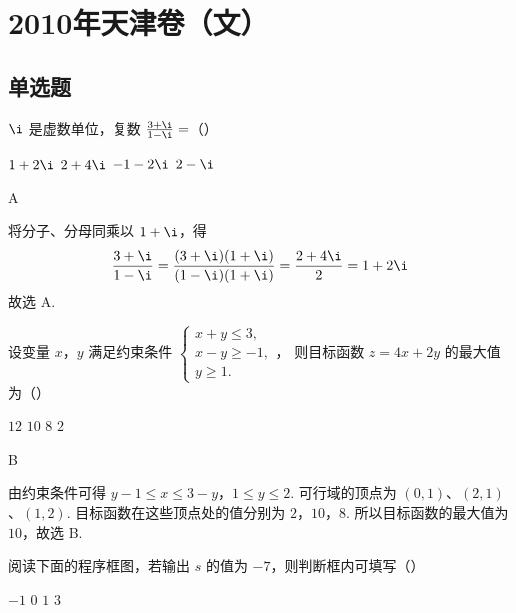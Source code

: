 \chapter{2010年天津卷（文）}

\section{单选题}

\begin{problem}
\(\i\) 是虚数单位，复数 \(\frac{3 + \i}{1 - \i} =\)（\quad）

\choices
    {\(1 + 2\i\)}
    {\(2 + 4\i\)}
    {\(-1 - 2\i\)}
    {\(2 - \i\)}
\end{problem}

\begin{answer}
A
\end{answer}

\begin{solution}
将分子、分母同乘以 \(1+\i\)，得
\[
\frac{3+\i}{1-\i}=\frac{(3+\i)(1+\i)}{(1-\i)(1+\i)}
=\frac{2+4\i}{2}=1+2\i
\]
故选 A.
\end{solution}

\begin{problem}
设变量 \(x\)，\(y\) 满足约束条件 \(\begin{cases}
x + y \leqslant 3,\\
x - y \geqslant -1,\\
y \geqslant 1.
\end{cases}\)，
则目标函数 \(z = 4x + 2y\) 的最大值为（\quad）

\choices
    {\(12\)}
    {\(10\)}
    {\(8\)}
    {\(2\)}
\end{problem}

\begin{answer}
B
\end{answer}

\begin{solution}
由约束条件可得
\(y-1\leqslant x\leqslant 3-y\)，\(1\leqslant y\leqslant 2\).
可行域的顶点为 \((0,1)\)、\((2,1)\)、\((1,2)\). 目标函数在这些顶点处的值分别为
\(2\)，\(10\)，\(8\).
所以目标函数的最大值为 \(10\)，故选 B.
\end{solution}

\begin{problem}
阅读下面的程序框图，若输出 \(s\) 的值为 \(-7\)，则判断框内可填写（\quad）


\choices
    {\(-1\)}
    {\(0\)}
    {\(1\)}
    {\(3\)}
\end{problem}

